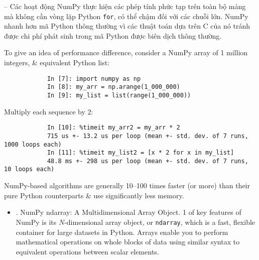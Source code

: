 \documentclass{article}
\begin{document}
\begin{enumerate}
\begin{itemize}
\begin{itemize}
			-- Các hoạt động NumPy thực hiện các phép tính phức tạp trên toàn bộ mảng mà không cần vòng lặp Python {\tt for}, có thể chậm đối với các chuỗi lớn. NumPy nhanh hơn mã Python thông thường vì các thuật toán dựa trên C của nó tránh được chi phí phát sinh trong mã Python được biên dịch thông thường.
		\end{itemize}
		To give an idea of performance difference, consider a NumPy array of 1 million integers, \& equivalent Python list:
		\begin{verbatim}
			In [7]: import numpy as np
			In [8]: my_arr = np.arange(1_000_000)
			In [9]: my_list = list(range(1_000_000))
		\end{verbatim}
		Multiply each sequence by 2:
		\begin{verbatim}
			In [10]: %timeit my_arr2 = my_arr * 2
			715 us +- 13.2 us per loop (mean +- std. dev. of 7 runs, 1000 loops each)
			In [11]: %timeit my_list2 = [x * 2 for x in my_list]
			48.8 ms +- 298 us per loop (mean +- std. dev. of 7 runs, 10 loops each)
		\end{verbatim}
		NumPy-based algorithms are generally 10--100 times faster (or more) than their pure Python counterparts \& use significantly less memory.
		\begin{itemize}
			\item {. NumPy ndarray: A Multidimensional Array Object.} 1 of key features of NumPy is its $N$-dimensional array object, or {\tt ndarray}, which is a fast, flexible container for large datasets in Python. Arrays enable you to perform mathematical operations on whole blocks of data using similar syntax to equivalent operations between scalar elements.
			

\end{itemize}
\end{itemize}
\end{enumerate}
\end{document}
